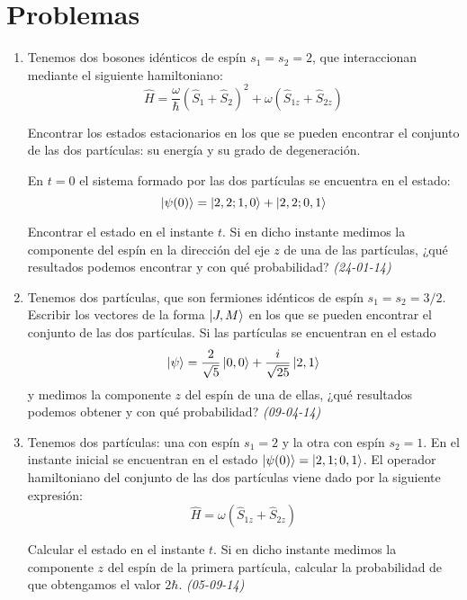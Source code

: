 \newpage

\section{Problemas}

\begin{enumerate}
    \item Tenemos dos bosones idénticos de espín \( s_1 = s_2 = 2 \), que interaccionan mediante el siguiente hamiltoniano:
    \[
    \hat{H} = \frac{\omega}{\hbar} \left( \hat{S}_1 + \hat{S}_2 \right)^2 + \omega \left( \hat{S}_{1z} + \hat{S}_{2z} \right)
    \]
    
    Encontrar los estados estacionarios en los que se pueden encontrar el conjunto de las dos partículas: su energía y su grado de degeneración.

    En \( t = 0 \) el sistema formado por las dos partículas se encuentra en el estado:
    \[
    \ket{\psi (0)} = \ket{2, 2; 1, 0} + \ket{2, 2; 0, 1}
    \]
    
    Encontrar el estado en el instante \( t \). Si en dicho instante medimos la componente del espín en la dirección del eje \( z \) de una de las partículas, ¿qué resultados podemos encontrar y con qué probabilidad? \textit{(24-01-14)}

    \item Tenemos dos partículas, que son fermiones idénticos de espín \( s_1 = s_2 = 3/2 \). Escribir los vectores de la forma \( \ket{J, M} \) en los que se pueden encontrar el conjunto de las dos partículas. Si las partículas se encuentran en el estado
    \[
    \ket{\psi} = \frac{2}{\sqrt{5}} \ket{0, 0} + \frac{i}{\sqrt{25}} \ket{2, 1}
    \]
    y medimos la componente \( z \) del espín de una de ellas, ¿qué resultados podemos obtener y con qué probabilidad? \textit{(09-04-14)}

    \item Tenemos dos partículas: una con espín \( s_1 = 2 \) y la otra con espín \( s_2 = 1 \). En el instante inicial se encuentran en el estado \( \ket{\psi (0)} = \ket{2, 1; 0, 1} \). El operador hamiltoniano del conjunto de las dos partículas viene dado por la siguiente expresión:
    \[
    \hat{H} = \omega \left( \hat{S}_{1z} + \hat{S}_{2z} \right)
    \]
    
    Calcular el estado en el instante \( t \). Si en dicho instante medimos la componente \( z \) del espín de la primera partícula, calcular la probabilidad de que obtengamos el valor \( 2\hbar \). \textit{(05-09-14)}


\end{enumerate}
